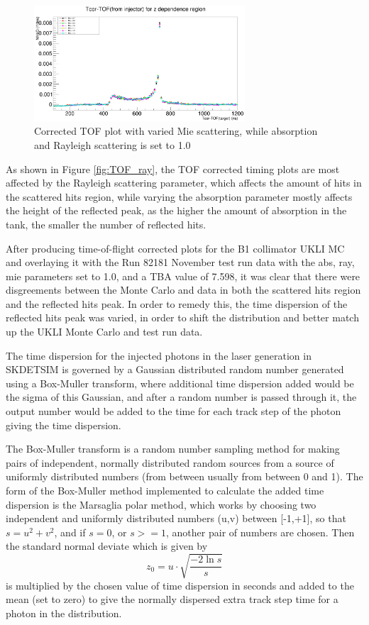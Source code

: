 \begin{figure}
    \centering
    \includegraphics[width=0.7\textwidth]{Figures/TOF_mie.PNG}
    \caption{Corrected TOF plot with varied Mie scattering, while absorption and Rayleigh scattering is set to 1.0}
    \label{fig:TOF_mie}
\end{figure}

As shown in Figure \ref{fig:TOF_ray}, the TOF corrected timing plots are most affected by the Rayleigh scattering parameter, which affects the amount of hits in the scattered hits region, while varying the absorption parameter mostly affects the height of the reflected peak, as the higher the amount of absorption in the tank, the smaller the number of reflected hits. 

After producing time-of-flight corrected plots for the B1 collimator UKLI MC and overlaying it with the Run 82181 November test run data with the abs, ray, mie parameters set to 1.0, and a TBA value of 7.598, it was clear that there were disgreements between the Monte Carlo and data in both the scattered hits region and the reflected hits peak. In order to remedy this, the time dispersion of the reflected hits peak was varied, in order to shift the distribution and better match up the UKLI Monte Carlo and test run data. 

The time dispersion for the injected photons in the laser generation in SKDETSIM is governed by a Gaussian distributed random number generated using a Box-Muller transform, where additional time dispersion added would be the sigma of this Gaussian, and after a random number is passed through it, the output number would be added to the time for each track step of the photon giving the time dispersion.

The Box-Muller transform is a random number sampling method for making pairs of independent, normally distributed random sources from a source of uniformly distributed numbers (from between usually from between 0 and 1). The form of the Box-Muller method implemented to calculate the added time dispersion is the Marsaglia polar method, which works by choosing two independent and uniformly distributed numbers (u,v) between [-1,+1], so that $s = u^{2} + v^{2}$, and if $s=0$, or $s>=1$, another pair of numbers are chosen. Then the standard normal deviate which is given by $$z_{0}=u \cdot \sqrt{\frac{-2 \ln s}{s}}$$ is multiplied by the chosen value of time dispersion in seconds and added to the mean (set to zero) to give the normally dispersed extra track step time for a photon in the distribution. 

